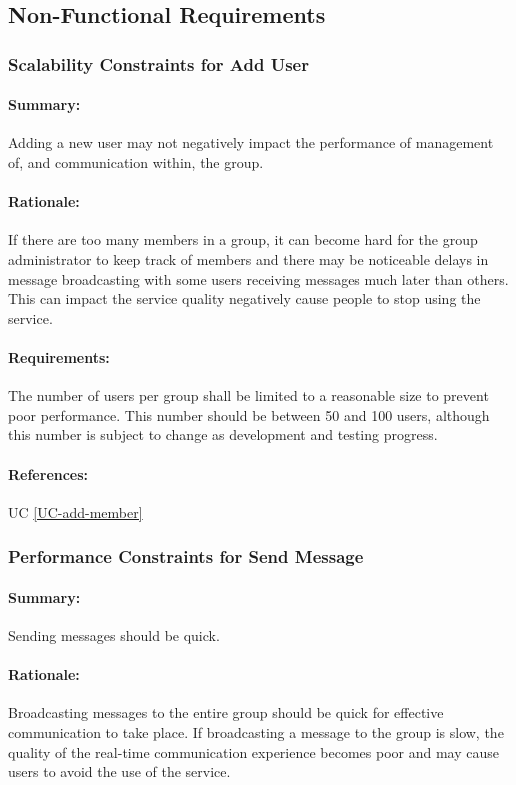 \documentclass[11pt]{article}
\begin{document}
\subsection{Non-Functional Requirements}

\subsubsection{Scalability Constraints for Add User} \label{NFR-scalability-add-member}
\paragraph{Summary:} Adding a new user may not negatively impact the performance of management of, and communication within, the group.
\paragraph{Rationale:} If there are too many members in a group, it can become hard for the group administrator to keep track of members and there may be noticeable delays in message broadcasting with some users receiving messages much later than others. This can impact the service quality negatively cause people to stop using the service.
\paragraph{Requirements:} The number of users per group shall be limited to a reasonable size to prevent poor performance. This number should be between 50 and 100 users, although this number is subject to change as development and testing progress.
\paragraph{References:} UC \ref{UC-add-member}

\subsubsection{Performance Constraints for Send Message} \label{NFR-performance-send-message}
\paragraph{Summary:} Sending messages should be quick.
\paragraph{Rationale:} Broadcasting messages to the entire group should be quick for effective communication to take place. If broadcasting a message to the group is slow, the quality of the real-time communication experience becomes poor and may cause users to avoid the use of the service. 
\end{document}
